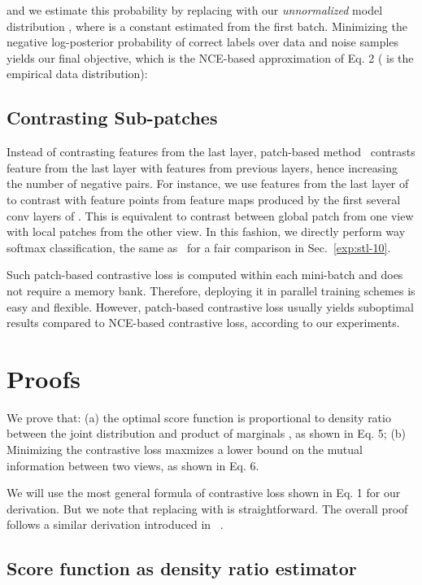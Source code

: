 \documentclass[10pt,twocolumn,letterpaper]{article}
\newcommand{\citep}[1]{\cite{#1}}
\begin{document}
and we estimate this probability by replacing  with our \emph{unnormalized} model distribution , where  is a constant estimated from the first batch. Minimizing the negative log-posterior probability of correct labels  over data and noise samples yields our final objective, which is the NCE-based approximation of Eq. 2 ( is the empirical data distribution):


\subsection{Contrasting Sub-patches}\label{app:sub-patch}

Instead of contrasting features from the last layer, patch-based method~\citep{hjelm2018learning} contrasts feature from the last layer with features from previous layers, hence increasing the number of negative pairs. For instance, we use features from the last layer of  to contrast with feature points from feature maps produced by the first several conv layers of . This is equivalent to contrast between global patch from one view with local patches from the other view. In this fashion, we directly perform  way softmax classification, the same as~\citep{oord2018representation,hjelm2018learning} for a fair comparison in Sec.~\ref{exp:stl-10}.

Such patch-based contrastive loss is computed within each mini-batch and does not require a memory bank. Therefore, deploying it in parallel training schemes is easy and flexible. However, patch-based contrastive loss usually yields suboptimal results compared to NCE-based contrastive loss, according to our experiments.


\section{Proofs}
\label{sec:app_MI}
We prove that: (a) the optimal score function  is proportional to density ratio between the joint distribution  and product of marginals , as shown in Eq. 5; (b) Minimizing the contrastive loss  maxmizes a lower bound on the mutual information between two views, as shown in Eq. 6.

We will use the most general formula of contrastive loss  shown in Eq. 1 for our derivation. But we note that replacing  with  is straightforward. The overall proof follows a similar derivation introduced in ~\citep{oord2018representation}.

\subsection{Score function as density ratio estimator}
\label{sec:app:score_function}
\end{document}
